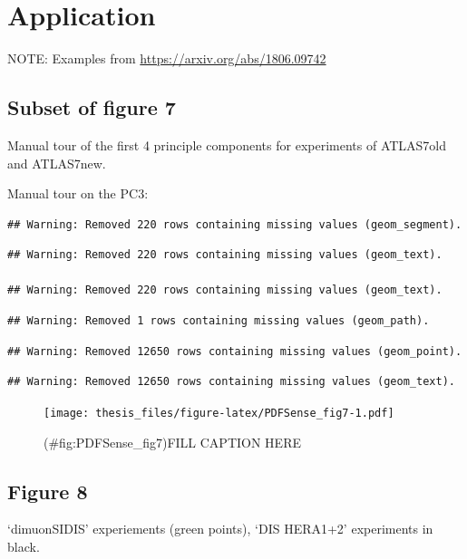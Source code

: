 \documentclass{monashthesis}
\begin{document}
\section{Application}\label{sec:application}

NOTE: Examples from \url{https://arxiv.org/abs/1806.09742}
\textcite{cook_dynamical_2018}

\subsection{Subset of figure 7}\label{subset-of-figure-7}

Manual tour of the first 4 principle components for experiments of
ATLAS7old and ATLAS7new.

Manual tour on the PC3:

\begin{verbatim}
## Warning: Removed 220 rows containing missing values (geom_segment).
\end{verbatim}

\begin{verbatim}
## Warning: Removed 220 rows containing missing values (geom_text).

## Warning: Removed 220 rows containing missing values (geom_text).
\end{verbatim}

\begin{verbatim}
## Warning: Removed 1 rows containing missing values (geom_path).
\end{verbatim}

\begin{verbatim}
## Warning: Removed 12650 rows containing missing values (geom_point).
\end{verbatim}

\begin{verbatim}
## Warning: Removed 12650 rows containing missing values (geom_text).
\end{verbatim}

\begin{figure}
\centering
\texttt{[image: thesis\_files/figure-latex/PDFSense\_fig7-1.pdf]}
\caption{(\#fig:PDFSense\_fig7)FILL CAPTION HERE}
\end{figure}

\subsection{Figure 8}\label{figure-8}

`dimuonSIDIS' experiements (green points), `DIS HERA1+2' experiments in
black.
\end{document}
